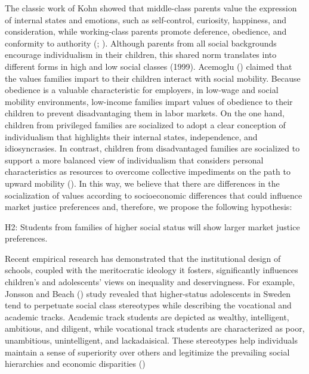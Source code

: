 \documentclass[
  letterpaper,
  DIV=11,
  numbers=noendperiod]{scrartcl}
\begin{document}
The classic work of Kohn showed that middle-class parents value the
expression of internal states and emotions, such as self-control,
curiosity, happiness, and consideration, while working-class parents
promote deference, obedience, and conformity to authority
(;
). Although
parents from all social backgrounds encourage individualism in their
children, this shared norm translates into different forms in high and
low social classes (1999). Acemoglu
() claimed that the values
families impart to their children interact with social mobility. Because
obedience is a valuable characteristic for employers, in low-wage and
social mobility environments, low-income families impart values of
obedience to their children to prevent disadvantaging them in labor
markets. On the one hand, children from privileged families are
socialized to adopt a clear conception of individualism that highlights
their internal states, independence, and idiosyncrasies. In contrast,
children from disadvantaged families are socialized to support a more
balanced view of individualism that considers personal characteristics
as resources to overcome collective impediments on the path to upward
mobility (). In this way, we believe that there are
differences in the socialization of values according to socioeconomic
differences that could influence market justice preferences and,
therefore, we propose the following hypothesis:

H2: Students from families of higher social status will show larger
market justice preferences.

Recent empirical research has demonstrated that the institutional design
of schools, coupled with the meritocratic ideology it fosters,
significantly influences children's and adolescents' views on inequality
and deservingness. For example, Jonsson and Beach
() study revealed that
higher-status adolescents in Sweden tend to perpetuate social class
stereotypes while describing the vocational and academic tracks.
Academic track students are depicted as wealthy, intelligent, ambitious,
and diligent, while vocational track students are characterized as poor,
unambitious, unintelligent, and lackadaisical. These stereotypes help
individuals maintain a sense of superiority over others and legitimize
the prevailing social hierarchies and economic disparities
()
\end{document}

